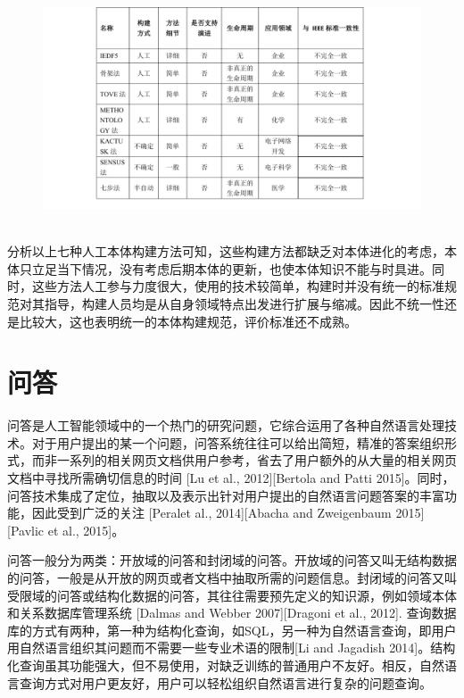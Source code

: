 \begin{figure}[!htb]
	\centering\includegraphics[height=7cm]{resource/onto_method_compare}
	\label{fig:onto_method_compare}
\end{figure}

分析以上七种人工本体构建方法可知，这些构建方法都缺乏对本体进化的考虑，本体只立足当下情况，没有考虑后期本体的更新，也使本体知识不能与时具进。同时，这些方法人工参与力度很大，使用的技术较简单，构建时并没有统一的标准规范对其指导，构建人员均是从自身领域特点出发进行扩展与缩减。因此不统一性还是比较大，这也表明统一的本体构建规范，评价标准还不成熟。

\section{问答}
问答是人工智能领域中的一个热门的研究问题，它综合运用了各种自然语言处理技术。对于用户提出的某一个问题，问答系统往往可以给出简短，精准的答案组织形式，而非一系列的相关网页文档供用户参考，省去了用户额外的从大量的相关网页文档中寻找所需确切信息的时间 [Lu et al., 2012][Bertola and Patti 2015]。同时，问答技术集成了定位，抽取以及表示出针对用户提出的自然语言问题答案的丰富功能，因此受到广泛的关注 [Peralet al., 2014][Abacha and Zweigenbaum 2015][Pavlic et al., 2015]。

问答一般分为两类：开放域的问答和封闭域的问答。开放域的问答又叫无结构数据的问答，一般是从开放的网页或者文档中抽取所需的问题信息。封闭域的问答又叫受限域的问答或结构化数据的问答，其往往需要预先定义的知识源，例如领域本体和关系数据库管理系统 [Dalmas and Webber 2007][Dragoni et al., 2012]. 查询数据库的方式有两种，第一种为结构化查询，如SQL，另一种为自然语言查询，即用户用自然语言组织其问题而不需要一些专业术语的限制[Li and Jagadish 2014]。结构化查询虽其功能强大，但不易使用，对缺乏训练的普通用户不友好。相反，自然语言查询方式对用户更友好，用户可以轻松组织自然语言进行复杂的问题查询。

